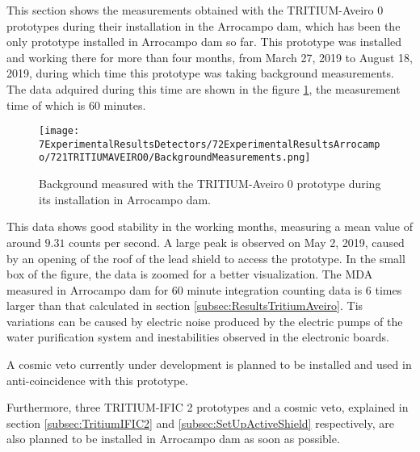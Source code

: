 This section shows the measurements obtained with the TRITIUM-Aveiro 0 prototypes during their installation in the Arrocampo dam, which has been the only prototype installed in Arrocampo dam so far. This prototype was installed and working there for more than four months, from March 27, 2019 to August 18, 2019, during which time this prototype was taking background measurements. The data adquired during this time are shown in the figure \ref{fig:BackgroundArrocampoAveiro}, the measurement time of which is 60 minutes.

\begin{figure}[h]
\centering
\texttt{[image: 7ExperimentalResultsDetectors/72ExperimentalResultsArrocampo/721TRITIUMAVEIRO0/BackgroundMeasurements.png]}
\caption{Background measured with the TRITIUM-Aveiro 0 prototype during its installation in Arrocampo dam.\label{fig:BackgroundArrocampoAveiro}}
\end{figure}

This data shows good stability in the working months, measuring a mean value of around $9.31$ counts per second. A large peak is observed on May 2, 2019, caused by an opening of the roof of the lead shield to access the prototype. In the small box of the figure, the data is zoomed for a better visualization. The MDA measured in Arrocampo dam for 60 minute integration counting data is 6 times larger than that calculated in section \ref{subsec:ResultsTritiumAveiro}. Tis variations can be caused by electric noise produced by the electric pumps of the water purification system and inestabilities observed in the electronic boards.

A cosmic veto currently under development is planned to be installed and used in anti-coincidence with this prototype.

Furthermore, three TRITIUM-IFIC 2 prototypes and a cosmic veto, explained in section \ref{subsec:TritiumIFIC2} and \ref{subsec:SetUpActiveShield} respectively, are also planned to be installed in Arrocampo dam as soon as possible.